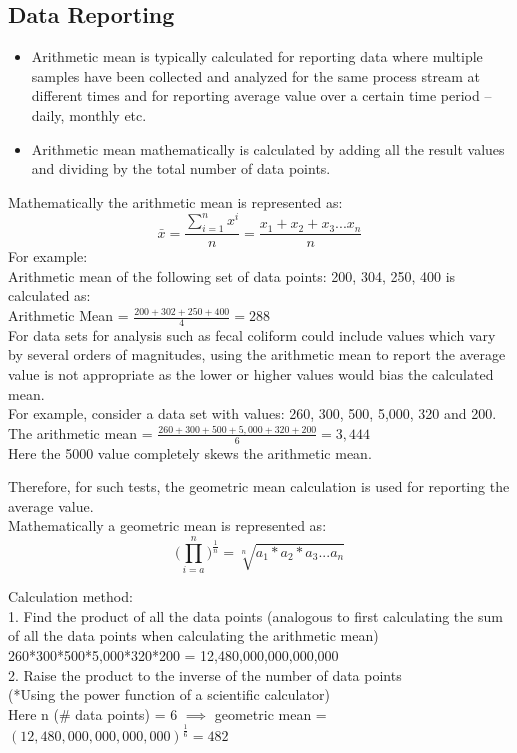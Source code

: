 \documentclass{article}
\begin{document}
\subsection{Data Reporting}	
		\begin{itemize}
			\item Arithmetic mean is typically calculated for reporting data where multiple samples have been collected and analyzed for the same process stream at different times and for reporting average value over a certain time period – daily, monthly etc.\\ \item Arithmetic mean mathematically is calculated by adding all the result values and dividing by the total number of data points.\\
		\end{itemize}
		Mathematically the arithmetic mean is represented as:\\
		$$\bar{x}=\frac{\sum_{i=1}^{n} x^i}{n} = \frac{x_1+x_2+x_3...x_n}{n}$$
		For example:\\
		Arithmetic mean of the following set of data points:  200, 304, 250, 400 is calculated as:\\
		\vspace{10pt}
		Arithmetic Mean = $\frac{200 + 302 + 250 + 400}{4}= 288$\\
		\vspace{10pt}
		For data sets for analysis such as fecal coliform could include values which vary by several orders of magnitudes, using the arithmetic mean to report the average value is not appropriate as the lower or higher values would bias the calculated mean.\\
		\vspace{10pt}
		For example, consider a data set with values:  260, 300, 500, 5,000, 320 and 200.\\
		\vspace{10pt}
		The arithmetic mean = $\frac{260+300+500+5,000+320+200}{6} = 3,444$\\
		Here the 5000 value completely skews the arithmetic mean.
		
		Therefore, for such tests, the geometric mean calculation is used for reporting the average value.\\
		
		
		Mathematically a geometric mean is represented as:\\
		$$\Bigg(\prod_{i=a}^n\Bigg)^{\frac{1}{n}}=\sqrt[n]{a_1*a_2*a_3...a_n}$$
		 
		Calculation method:\\
		1.	Find the product of all the data points (analogous to first calculating the sum of all the data points when calculating the arithmetic mean)\\
		260*300*500*5,000*320*200 = 12,480,000,000,000,000\\
		2.	Raise the product to the inverse of the number of data points\\
		(*Using the power function of a scientific calculator)\\
		Here n (\# data points) = 6 $\implies$ geometric mean = $(12,480,000,000,000,000)^{\frac{1}{6}}   = 482$
\end{document}

